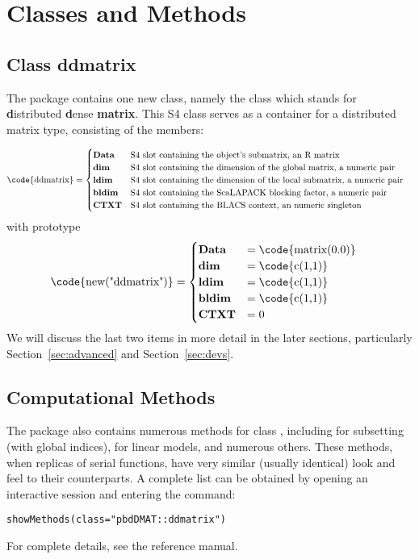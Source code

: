 \section{Classes and Methods}

\subsection{Class ddmatrix}

The package  contains one new class, namely the class  which stands for \textbf{d}istributed \textbf{d}ense \textbf{matrix}.  This S4 class serves as a container for a distributed matrix type, consisting of the members:

\begin{align*}
\text{\code{ddmatrix}}&=\begin{cases}
 $\textbf{Data}$ & $S4 slot containing the object's submatrix, an R matrix$\\
 $\textbf{dim}$ & $S4 slot containing the dimension of the global matrix, a numeric pair$\\
 $\textbf{ldim}$ & $S4 slot containing the dimension of the local submatrix, a numeric pair$\\
 $\textbf{bldim}$ & $S4 slot containing the ScaLAPACK blocking factor, a numeric pair$\\
 $\textbf{CTXT}$ & $S4 slot containing the BLACS context, an numeric singleton$
 \end{cases}
\end{align*}
with prototype
\begin{align*}
\text{\code{new("ddmatrix")}}&=\begin{cases}
 $\textbf{Data}$ & =\text{\code{matrix(0.0)}}\\
 $\textbf{dim}$ & =\text{\code{c(1,1)}}\\
 $\textbf{ldim}$ & =\text{\code{c(1,1)}}\\
 $\textbf{bldim}$ & =\text{\code{c(1,1)}}\\
 $\textbf{CTXT}$ & =0
 \end{cases}
\end{align*}
We will discuss the last two items in more detail in the later sections, particularly Section~\ref{sec:advanced} and Section~\ref{sec:devs}.




\subsection{Computational Methods}
\label{sec:methods}


The  package also contains numerous methods for class , including \code{`[`} for subsetting (with global indices),  for linear models, and numerous others.  These methods, when replicas of serial  functions, have very similar (usually identical) look and feel to their  counterparts.  A complete list can be obtained by opening an interactive  session and entering the command:
\begin{lstlisting}[language=rr]
showMethods(class="pbdDMAT::ddmatrix")
\end{lstlisting} 
For complete details, see the  reference manual.
